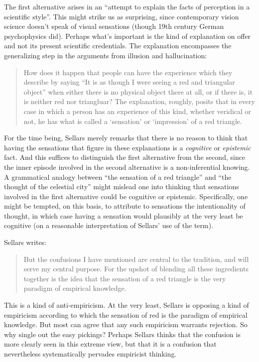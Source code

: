 \documentclass[11pt]{article}
\begin{document}
The first alternative arises in an ``attempt to explain the facts of perception in a scientific style''. This might strike us as surprising, since contemporary vision science doesn't speak of visual sensations (though 19th century German psychophysics did). Perhaps what's important is the kind of explanation on offer and not its present scientific credentials. The explanation encompasses the generalizing step in the arguments from illusion and hallucination:
\begin{quote}
	How does it happen that people can have the experience which they describe by saying ``It is as though I were seeing a red and triangular object'' when either there is no physical object there at all, or if there is, it is neither red nor triangluar? The explanation, roughly, posits that in every case in which a person has an experience of this kind, whether veridical or not, he has what is called a `sensation' or `impression' of a red triangle.
\end{quote}
For the time being, Sellars merely remarks that there is no reason to think that having the sensations that figure in these explanations is a \emph{cognitive} or \emph{epistemic} fact. And this suffices to distinguish the first alternative from the second, since the inner episode involved in the second alternative is a non-inferential knowing. A grammatical analogy between ``the sensation of a red triangle'' and ``the thought of the celestial city'' might mislead one into thinking that sensations involved in the first alternative could be cognitive or epistemic. Specifically, one might be tempted, on this basis, to attribute to sensations the intentionality of thought, in which case having a sensation would plausibly at the very least be cognitive (on a reasonable interpretation of Sellars' use of the term).

Sellars writes:
\begin{quote}
	But the confusions I have mentioned are central to the tradition, and will serve my central purpose. For the upshot of blending all these ingredients together is the idea that the sensation of a red triangle is the very paradigm of empirical knowledge.
\end{quote}
This is a kind of anti-empiricism. At the very least, Sellars is opposing a kind of empiricism according to which the sensation of red is the paradigm of empirical knowledge. But most can agree that any such empiricism warrants rejection. So why single out the easy pickings? Perhaps Sellars thinks that the confusion is more clearly seen in this extreme view, but that it is a confusion that nevertheless systematically pervades empiricist thinking.
\end{document}
